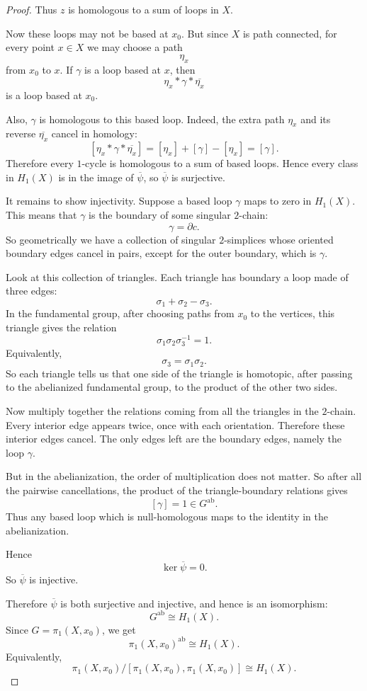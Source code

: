 \documentclass[11pt,a4paper]{article}
\theoremstyle{definition}
\theoremstyle{plain}
\theoremstyle{remark}
\newcommand{\1}{\mathbbm{1}}
\begin{document}
\begin{proof}
Thus $z$ is homologous to a sum of loops in $X$.

Now these loops may not be based at $x_0$. But since $X$ is path connected, for every point
$x\in X$ we may choose a path
\[
\eta_x
\]
from $x_0$ to $x$. If $\gamma$ is a loop based at $x$, then
\[
\eta_x * \gamma * \overline{\eta_x}
\]
is a loop based at $x_0$.

Also, $\gamma$ is homologous to this based loop. Indeed, the extra path $\eta_x$ and its
reverse $\overline{\eta_x}$ cancel in homology:
\[
[\eta_x * \gamma * \overline{\eta_x}]
=
[\eta_x]+[\gamma]-[\eta_x]
=
[\gamma].
\]
Therefore every $1$-cycle is homologous to a sum of based loops. Hence every class in
$H_1(X)$ is in the image of $\overline{\psi}$, so $\overline{\psi}$ is surjective.

It remains to show injectivity. Suppose a based loop $\gamma$ maps to zero in $H_1(X)$.
This means that $\gamma$ is the boundary of some singular $2$-chain:
\[
\gamma=\partial c.
\]
So geometrically we have a collection of singular $2$-simplices whose oriented boundary
edges cancel in pairs, except for the outer boundary, which is $\gamma$.

Look at this collection of triangles. Each triangle has boundary a loop made of three edges:
\[
\sigma_1+\sigma_2-\sigma_3.
\]
In the fundamental group, after choosing paths from $x_0$ to the vertices, this triangle gives
the relation
\[
\sigma_1\sigma_2\sigma_3^{-1}=1.
\]
Equivalently,
\[
\sigma_3=\sigma_1\sigma_2.
\]
So each triangle tells us that one side of the triangle is homotopic, after passing to the
abelianized fundamental group, to the product of the other two sides.

Now multiply together the relations coming from all the triangles in the $2$-chain. Every
interior edge appears twice, once with each orientation. Therefore these interior edges cancel.
The only edges left are the boundary edges, namely the loop $\gamma$.

But in the abelianization, the order of multiplication does not matter. So after all the pairwise
cancellations, the product of the triangle-boundary relations gives
\[
[\gamma]=1\in G^{\mathrm{ab}}.
\]
Thus any based loop which is null-homologous maps to the identity in the abelianization.

Hence
\[
\ker \overline{\psi}=0.
\]
So $\overline{\psi}$ is injective.

Therefore $\overline{\psi}$ is both surjective and injective, and hence is an isomorphism:
\[
G^{\mathrm{ab}}\cong H_1(X).
\]
Since $G=\pi_1(X,x_0)$, we get
\[
\pi_1(X,x_0)^{\mathrm{ab}}\cong H_1(X).
\]
Equivalently,
\[
\pi_1(X,x_0)/[\pi_1(X,x_0),\pi_1(X,x_0)]\cong H_1(X).
\]
\end{proof}
\end{document}
